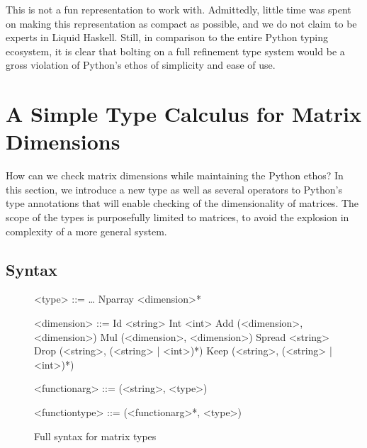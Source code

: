 \documentclass{article}
\begin{document}
This is not a fun representation to work with. Admittedly, little time was spent on making this representation as compact as possible, and we do not claim to be experts in Liquid Haskell. Still, in comparison to the entire Python typing ecosystem, it is clear that bolting on a full refinement type system would be a gross violation of Python's ethos of simplicity and ease of use.
\newpage

\section{A Simple Type Calculus for Matrix Dimensions}

How can we check matrix dimensions while maintaining the Python ethos? In this section, we introduce a new type as well as several operators to Python's type annotations that will enable checking of the dimensionality of matrices. The scope of the types is purposefully limited to matrices, to avoid the explosion in complexity of a more general system.

\subsection{Syntax}

\begin{figure}
    \centering
    \begin{grammar}
        <type> ::= \ldots
        \alt Nparray <dimension>*

        <dimension> ::= Id <string>
        \alt Int <int>
        \alt Add (<dimension>, <dimension>)
        \alt Mul (<dimension>, <dimension>)
        \alt Spread <string>
        \alt Drop (<string>, (<string> | <int>)*)
        \alt Keep (<string>, (<string> | <int>)*)

        <functionarg> ::= (<string>, <type>)

        <functiontype> ::= (<functionarg>*, <type>)

    \end{grammar}
    \caption{Full syntax for matrix types}
    \label{syntax}
\end{figure}
\end{document}
